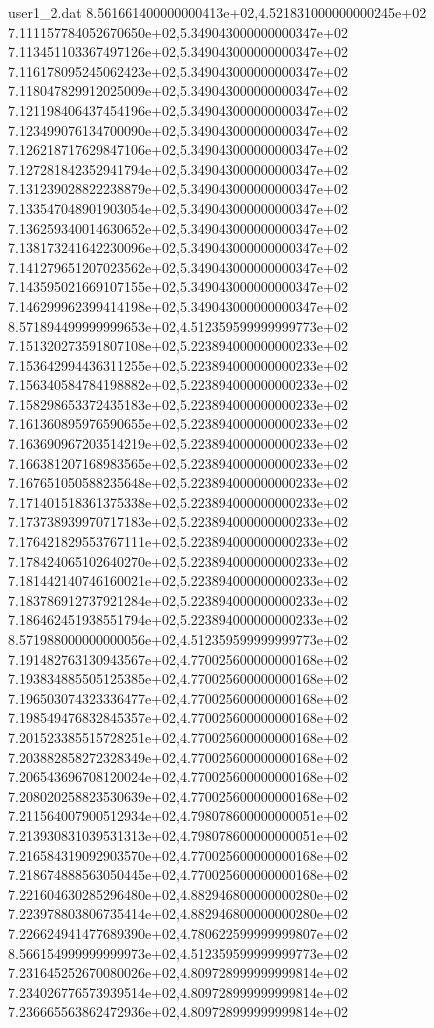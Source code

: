 \begin{filecontents}{user1_2.dat}
8.561661400000000413e+02,4.521831000000000245e+02
7.111157784052670650e+02,5.349043000000000347e+02
7.113451103367497126e+02,5.349043000000000347e+02
7.116178095245062423e+02,5.349043000000000347e+02
7.118047829912025009e+02,5.349043000000000347e+02
7.121198406437454196e+02,5.349043000000000347e+02
7.123499076134700090e+02,5.349043000000000347e+02
7.126218717629847106e+02,5.349043000000000347e+02
7.127281842352941794e+02,5.349043000000000347e+02
7.131239028822238879e+02,5.349043000000000347e+02
7.133547048901903054e+02,5.349043000000000347e+02
7.136259340014630652e+02,5.349043000000000347e+02
7.138173241642230096e+02,5.349043000000000347e+02
7.141279651207023562e+02,5.349043000000000347e+02
7.143595021669107155e+02,5.349043000000000347e+02
7.146299962399414198e+02,5.349043000000000347e+02
8.571894499999999653e+02,4.512359599999999773e+02
7.151320273591807108e+02,5.223894000000000233e+02
7.153642994436311255e+02,5.223894000000000233e+02
7.156340584784198882e+02,5.223894000000000233e+02
7.158298653372435183e+02,5.223894000000000233e+02
7.161360895976590655e+02,5.223894000000000233e+02
7.163690967203514219e+02,5.223894000000000233e+02
7.166381207168983565e+02,5.223894000000000233e+02
7.167651050588235648e+02,5.223894000000000233e+02
7.171401518361375338e+02,5.223894000000000233e+02
7.173738939970717183e+02,5.223894000000000233e+02
7.176421829553767111e+02,5.223894000000000233e+02
7.178424065102640270e+02,5.223894000000000233e+02
7.181442140746160021e+02,5.223894000000000233e+02
7.183786912737921284e+02,5.223894000000000233e+02
7.186462451938551794e+02,5.223894000000000233e+02
8.571988000000000056e+02,4.512359599999999773e+02
7.191482763130943567e+02,4.770025600000000168e+02
7.193834885505125385e+02,4.770025600000000168e+02
7.196503074323336477e+02,4.770025600000000168e+02
7.198549476832845357e+02,4.770025600000000168e+02
7.201523385515728251e+02,4.770025600000000168e+02
7.203882858272328349e+02,4.770025600000000168e+02
7.206543696708120024e+02,4.770025600000000168e+02
7.208020258823530639e+02,4.770025600000000168e+02
7.211564007900512934e+02,4.798078600000000051e+02
7.213930831039531313e+02,4.798078600000000051e+02
7.216584319092903570e+02,4.770025600000000168e+02
7.218674888563050445e+02,4.770025600000000168e+02
7.221604630285296480e+02,4.882946800000000280e+02
7.223978803806735414e+02,4.882946800000000280e+02
7.226624941477689390e+02,4.780622599999999807e+02
8.566154999999999973e+02,4.512359599999999773e+02
7.231645252670080026e+02,4.809728999999999814e+02
7.234026776573939514e+02,4.809728999999999814e+02
7.236665563862472936e+02,4.809728999999999814e+02

\end{filecontents}
